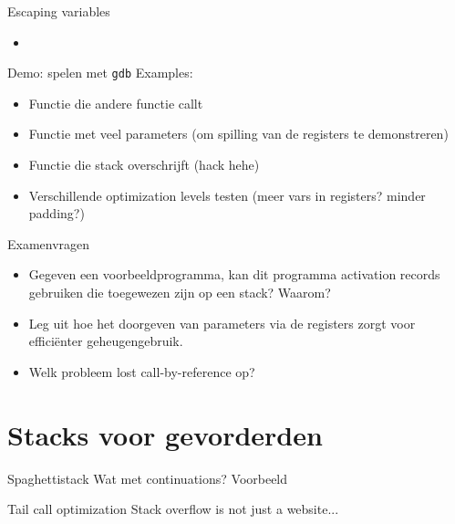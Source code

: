 \documentclass{beamer}
\begin{document}

\begin{frame}{Escaping variables}
	\begin{itemize}
		\item<1-> 
	\end{itemize}
\end{frame}

\begin{frame}{Demo: spelen met \texttt{gdb}}
	Examples:
	\begin{itemize}
		\item Functie die andere functie callt
		\item Functie met veel parameters (om spilling van de registers te demonstreren)
		\item Functie die stack overschrijft (hack hehe)
		\item Verschillende optimization levels testen (meer vars in registers? minder padding?)
	\end{itemize}
\end{frame}

\begin{frame}{Examenvragen}
	\begin{itemize}
		\item Gegeven een voorbeeldprogramma, kan dit programma activation records gebruiken die toegewezen zijn op een stack? Waarom?
		\item Leg uit hoe het doorgeven van parameters via de registers zorgt voor efficiënter geheugengebruik.
		\item Welk probleem lost call-by-reference op?
	\end{itemize}
\end{frame}

\section{Stacks voor gevorderden}
\begin{frame}{Spaghettistack}
	Wat met continuations?
	Voorbeeld
\end{frame}

\begin{frame}{Tail call optimization}
	Stack overflow is not just a website...
\end{frame}
\end{document}
